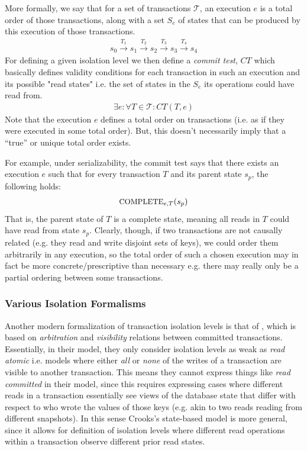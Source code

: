 \documentclass[10pt,a4paper]{article}
\begin{document}
More formally, we say that for a set of transactions $\mathcal{T}$, an execution $e$ is a total order of those transactions, along with a set $S_e$ of states that can be produced by this execution of those transactions. 
\begin{align*}
    s_0 \overset{T_1}{\longrightarrow} s_1 \overset{T_2}{\longrightarrow} s_2 \overset{T_3}{\longrightarrow} s_3 \overset{T_4}{\longrightarrow} s_4
\end{align*}
For defining a given isolation level we then define a \textit{commit test}, $CT$ which basically defines validity conditions for each transaction in such an execution and its possible "read states" i.e. the set of states in the $S_e$ its operations could have read from. 
\begin{align*}
    \exists e : \forall T \in \mathcal{T} : CT(T,e)
\end{align*}
Note that the execution $e$ defines a total order on transactions (i.e. as if they were executed in some total order). But, this doesn't necessarily imply that a ``true'' or unique total order exists. 

For example, under serializability, the commit test says that there exists an execution $e$ such that for every transaction $T$ and its parent state $s_p$, the following holds: 
\begin{align*}
\text{\small COMPLETE}_{e,T} (s_p)
\end{align*}
That is, the parent state of $T$ is a complete state, meaning all reads in $T$ could have read from state $s_p$. Clearly, though, if two transactions are not causally related (e.g. they read and write disjoint sets of keys), we could order them arbitrarily in any execution, so the total order of such a chosen execution may in fact be more concrete/prescriptive than necessary e.g. there may really only be a partial ordering between some transactions.


\subsubsection{Various Isolation Formalisms}

Another modern formalization of transaction isolation levels is that of \cite{2018cerone}, which is based on \textit{arbitration} and \textit{visibility} relations between committed transactions. Essentially, in their model, they only consider isolation levels as weak as \textit{read atomic} i.e. models where either \textit{all} or \textit{none} of the writes of a transaction are visible to another transaction. This means they cannot express things like \textit{read committed} in their model, since this requires expressing cases where different reads in a transaction essentially see views of the database state that differ with respect to who wrote the values of those keys (e.g. akin to two reads reading from different snapshots).
In this sense Crooks's state-based model is more general, since it allows for definition of isolation levels where different read operations within a transaction observe different prior read states.
\end{document}
